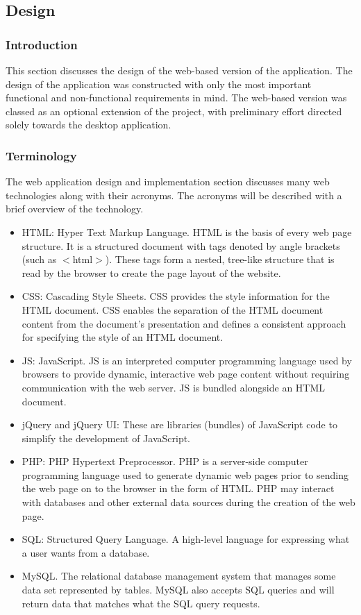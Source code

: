 \subsection{Design}

\subsubsection{Introduction}

This section discusses the design of the web-based version of the application.
The design of the application was constructed with only the most important
functional and non-functional requirements in mind. The web-based version was
classed as an optional extension of the project, with preliminary effort
directed solely towards the desktop application.

\subsubsection{Terminology}

The web application design and implementation section discusses many
web technologies along with their acronyms. The acronyms will be
described with a brief overview of the technology.

\begin{itemize}
\item HTML: Hyper Text Markup Language. HTML is the basis of every web page
structure. It is a structured document with tags denoted by angle brackets (such
as $<$html$>$). These tags form a nested, tree-like structure that is read by 
the browser to create the page layout of the website.
\item CSS: Cascading Style Sheets. CSS provides the style information for the
HTML document. CSS enables the separation of the HTML document content from the
document's presentation and defines a consistent approach for specifying the 
style of an HTML document.
\item JS: JavaScript. JS is an interpreted computer programming language used by
browsers to provide dynamic, interactive web page content without requiring
communication with the web server. JS is bundled alongside an HTML document.
\item jQuery and jQuery UI: These are libraries (bundles) of JavaScript code to
simplify the development of JavaScript.
\item PHP: PHP Hypertext Preprocessor. PHP is a server-side computer programming
language used to generate dynamic web pages prior to sending the web page on to 
the browser in the form of HTML. PHP may interact with databases and other 
external data sources during the creation of the web page.
\item SQL: Structured Query Language. A high-level language for expressing what
a user wants from a database.
\item MySQL. The relational database management system that manages some data 
set represented by tables. MySQL also accepts SQL queries and will return data 
that matches what the SQL query requests.
\end{itemize}

